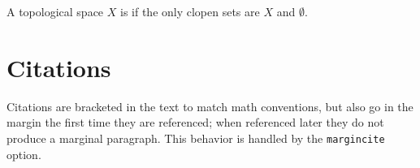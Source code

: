 \documentclass{sl2art}
\begin{document}
\begin{definition}
  A topological space \(X\) is  if the only clopen sets are \(X\) and \(\emptyset\).
\end{definition}



\section{Citations}
Citations are bracketed in the text \cite{Graham1994} to match math conventions, but also go in the margin the first time they are referenced; when referenced later \cite{Graham1994} they do not produce a marginal paragraph.
This behavior is handled by the \texttt{margincite} option.


\printbibliography
  
\end{document}
